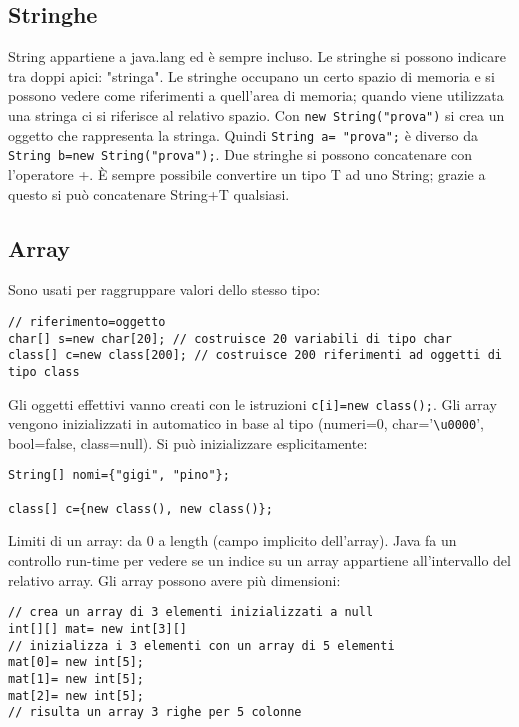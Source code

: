 \subsection{Stringhe}
String appartiene a java.lang ed è sempre incluso. 
Le stringhe si possono indicare tra doppi apici: "stringa".
Le stringhe occupano un certo spazio di memoria e si possono vedere come riferimenti a quell'area di memoria; quando viene utilizzata una stringa ci si riferisce al relativo spazio.
Con \texttt{new String("prova")} si crea un oggetto che rappresenta la stringa.
Quindi \texttt{String a= "prova";} è diverso da \texttt{String b=new String("prova");}.
Due stringhe si possono concatenare con l'operatore +. È sempre possibile convertire un tipo T ad uno String; grazie a questo si può concatenare String+T qualsiasi.

\subsection{Array}
Sono usati per raggruppare valori dello stesso tipo:
\begin{framed}
\begin{verbatim}
// riferimento=oggetto
char[] s=new char[20]; // costruisce 20 variabili di tipo char
class[] c=new class[200]; // costruisce 200 riferimenti ad oggetti di tipo class
\end{verbatim}
\end{framed}
Gli oggetti effettivi vanno creati con le istruzioni \texttt{c[i]=new class();}.
Gli array vengono inizializzati in automatico in base al tipo (numeri=0, char='\lstinline[breaklines=true]!\u0000!', bool=false, class=null).
Si può inizializzare esplicitamente:

\begin{framed}
\begin{verbatim}
String[] nomi={"gigi", "pino"};

class[] c={new class(), new class()};
\end{verbatim}
\end{framed}

Limiti di un array: da 0 a length (campo implicito dell'array). Java fa un controllo run-time per vedere se un indice su un array appartiene all'intervallo del relativo array.
Gli array possono avere più dimensioni:

\begin{framed}
\begin{verbatim}
// crea un array di 3 elementi inizializzati a null
int[][] mat= new int[3][] 
// inizializza i 3 elementi con un array di 5 elementi
mat[0]= new int[5]; 
mat[1]= new int[5];
mat[2]= new int[5];
// risulta un array 3 righe per 5 colonne
\end{verbatim}
\end{framed}


